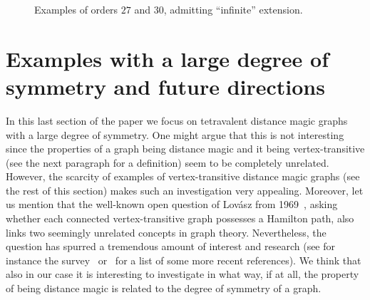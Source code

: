 \documentclass[11 pt,english]{article}
\theoremstyle{definition}
\begin{document}
\begin{figure}[htbp]
\begin{center}
{
}
\caption{Examples of orders $27$ and $30$, admitting ``infinite'' extension.}
\label{fig:n27_30}
\end{center}
\end{figure}


\section{Examples with a large degree of symmetry and future directions}
\label{sec:VT}

In this last section of the paper we focus on tetravalent distance magic graphs with a large degree of symmetry. One might argue that this is not interesting since the properties of a graph being distance magic and it being vertex-transitive (see the next paragraph for a definition) seem to be completely unrelated. However, the scarcity of examples of vertex-transitive distance magic graphs (see the rest of this section) makes such an investigation very appealing. Moreover, let us mention that the well-known open question of Lov\'asz from 1969~\cite{Lov69}, asking whether each connected vertex-transitive graph possesses a Hamilton path, also links two seemingly unrelated concepts in graph theory. Nevertheless, the question has spurred a tremendous amount of interest and research (see for instance the survey~\cite{KutMar09} or~\cite{KutMarRaz25} for a list of some more recent references). We think that also in our case it is interesting to investigate in what way, if at all, the property of being distance magic is related to the degree of symmetry of a graph.
\end{document}
